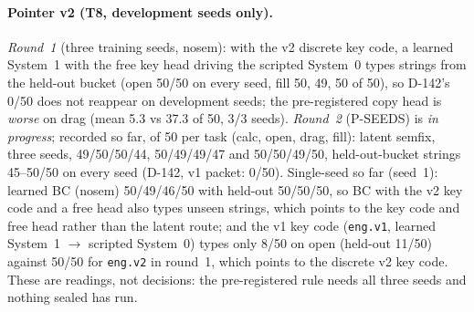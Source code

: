\documentclass[10pt,twocolumn]{article}
\begin{document}
\paragraph{Pointer v2 (T8, development seeds only).} \emph{Round~1} (three training seeds, nosem): with the v2 discrete key code, a learned System~1 with the free key head driving the scripted System~0 types strings from the held-out bucket (open 50/50 on every seed, fill 50, 49, 50 of 50), so D-142's 0/50 does not reappear on development seeds; the pre-registered copy head is \emph{worse} on drag (mean 5.3 vs 37.3 of 50, 3/3 seeds). \emph{Round~2} (P-SEEDS) is \emph{in progress}; recorded so far, of 50 per task (calc, open, drag, fill): latent semfix, three seeds, 49/50/50/44, 50/49/49/47 and 50/50/49/50, held-out-bucket strings 45--50/50 on every seed (D-142, v1 packet: 0/50). Single-seed so far (seed~1): learned BC (nosem) 50/49/46/50 with held-out 50/50/50, so BC with the v2 key code and a free head also types unseen strings, which points to the key code and free head rather than the latent route; and the v1 key code (\texttt{eng.v1}, learned System~1 $\to$ scripted System~0) types only 8/50 on open (held-out 11/50) against 50/50 for \texttt{eng.v2} in round~1, which points to the discrete v2 key code. These are readings, not decisions: the pre-registered rule needs all three seeds and nothing sealed has run.
\end{document}
